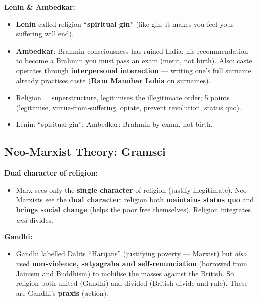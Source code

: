 \begin{CriticalPoint}
\textbf{Lenin \& Ambedkar:}
\begin{itemize}
\item \textbf{Lenin} called religion ``\textbf{spiritual gin}'' (like gin, it makes you feel your suffering will end).
\item \textbf{Ambedkar}: Brahmin consciousness has ruined India; his recommendation --- to become a Brahmin you must pass an exam (merit, not birth). Also: caste operates through \textbf{interpersonal interaction} --- writing one's full surname already practises caste (\textbf{Ram Manohar Lohia} on surnames).
\end{itemize}
\end{CriticalPoint}

\begin{QuickRevision}
\begin{itemize}
\item Religion = superstructure, legitimises the illegitimate order; 5 points (legitimise, virtue-from-suffering, opiate, prevent revolution, status quo).
\item Lenin: ``spiritual gin''; Ambedkar: Brahmin by exam, not birth.
\end{itemize}
\end{QuickRevision}

\sectiondivider

\subsection{Neo-Marxist Theory: Gramsci}

\begin{KeyConcept}
\textbf{Dual character of religion:}
\begin{itemize}
\item Marx sees only the \textbf{single character} of religion (justify illegitimate). Neo-Marxists see the \textbf{dual character}: religion both \textbf{maintains status quo} and \textbf{brings social change} (helps the poor free themselves). Religion integrates \textit{and} divides.
\end{itemize}
\end{KeyConcept}

\begin{ExampleBox}
\textbf{Gandhi:}
\begin{itemize}
\item Gandhi labelled Dalits ``Harijans'' (justifying poverty --- Marxist) but \textit{also} used \textbf{non-violence, satyagraha and self-renunciation} (borrowed from Jainism and Buddhism) to mobilise the masses against the British. So religion both united (Gandhi) and divided (British divide-and-rule). These are Gandhi's \textbf{praxis} (action).
\end{itemize}
\end{ExampleBox}

